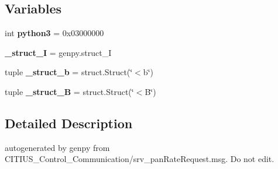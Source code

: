 \subsection*{\-Variables}
\begin{DoxyCompactItemize}
\item 
\hypertarget{namespace_c_i_t_i_u_s___control___communication_1_1srv_1_1__srv__pan_rate_ac61995b404c234fcb9a6c0120f2e31b6}{int {\bfseries python3} = 0x03000000}\label{namespace_c_i_t_i_u_s___control___communication_1_1srv_1_1__srv__pan_rate_ac61995b404c234fcb9a6c0120f2e31b6}

\item 
\hypertarget{namespace_c_i_t_i_u_s___control___communication_1_1srv_1_1__srv__pan_rate_ac428715e05cbda40d275ff156c3a5784}{{\bfseries \-\_\-struct\-\_\-\-I} = genpy.\-struct\-\_\-\-I}\label{namespace_c_i_t_i_u_s___control___communication_1_1srv_1_1__srv__pan_rate_ac428715e05cbda40d275ff156c3a5784}

\item 
\hypertarget{namespace_c_i_t_i_u_s___control___communication_1_1srv_1_1__srv__pan_rate_a7c4b0892ba80e28fcdcd86cd46d59eff}{tuple {\bfseries \-\_\-struct\-\_\-b} = struct.\-Struct(\char`\"{}$<$b\char`\"{})}\label{namespace_c_i_t_i_u_s___control___communication_1_1srv_1_1__srv__pan_rate_a7c4b0892ba80e28fcdcd86cd46d59eff}

\item 
\hypertarget{namespace_c_i_t_i_u_s___control___communication_1_1srv_1_1__srv__pan_rate_a4a66ea54505f71b08172950eb72b9bbf}{tuple {\bfseries \-\_\-struct\-\_\-\-B} = struct.\-Struct(\char`\"{}$<$\-B\char`\"{})}\label{namespace_c_i_t_i_u_s___control___communication_1_1srv_1_1__srv__pan_rate_a4a66ea54505f71b08172950eb72b9bbf}

\end{DoxyCompactItemize}


\subsection{\-Detailed \-Description}
\begin{DoxyVerb}autogenerated by genpy from CITIUS_Control_Communication/srv_panRateRequest.msg. Do not edit.\end{DoxyVerb}
 